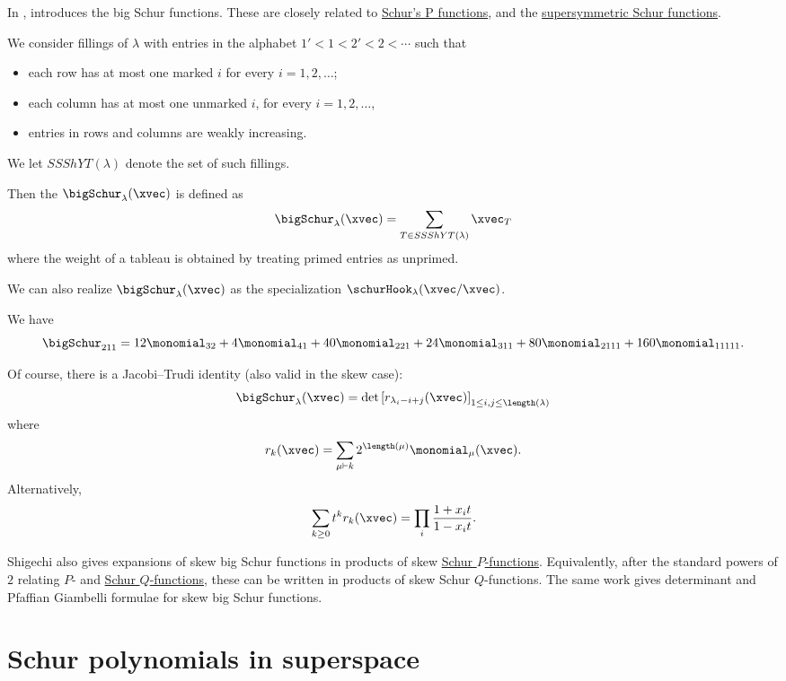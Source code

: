 In \cite{Shigechi2017x},  introduces the big Schur functions.
These are closely related to \hyperref[schurP]{Schur's P functions},
and the \hyperref[hookSchur]{supersymmetric Schur functions}.

We consider fillings of $\lambda$ with entries in
the alphabet $1' \lt 1 \lt 2' \lt 2 \lt \dotsb $
such that
\begin{itemize}
\item
	each row has at most one marked $i$ for every $i=1,2,\dotsc$;
\item
	each column has at most one unmarked $i$, for every $i=1,2,\dotsc$,
\item
	entries in rows and columns are weakly increasing.
\end{itemize}
We let $SSShYT(\lambda)$ denote the set of such fillings.

Then the \label{bigSchurFunction}
$\bigSchur_{\lambda}(\xvec)$
is defined as
\[
\bigSchur_{\lambda}(\xvec) = \sum_{T \in SSShYT(\lambda)} \xvec_T
\]
where the weight of a tableau is obtained by treating primed entries as unprimed.

We can also realize $\bigSchur_{\lambda}(\xvec)$ as the specialization $\schurHook_{\lambda}(\xvec/\xvec)$.


\begin{example}
We have
\[
\bigSchur_{211}
= 12 \monomial_{32}+4 \monomial_{41}+40 \monomial_{221}
+24 \monomial_{311}+80 \monomial_{2111}+160 \monomial_{11111}.
\]
\end{example}


Of course, there is a Jacobi--Trudi identity (also valid in the skew case):
\[
\bigSchur_{\lambda}(\xvec) = \det\left[ r_{\lambda_i -i +j}(\xvec) \right]_{1\leq i, j \leq \length(\lambda)}
\]
where
\[
r_k(\xvec) = \sum_{\mu \vdash k} 2^{\length(\mu)} \monomial_{\mu}(\xvec).
\]
Alternatively,
\[
\sum_{k \geq 0} t^k r_k(\xvec) =
\prod_{i} \frac{1+x_i t}{1-x_i t}.
\]

Shigechi also gives expansions of skew big Schur functions in products of
skew \hyperref[schurP]{Schur $P$-functions}.  Equivalently, after the
standard powers of $2$ relating $P$- and \hyperref[schurQ]{Schur
$Q$-functions}, these can be written in products of skew Schur
$Q$-functions.  The same work gives determinant and Pfaffian Giambelli
formulae for skew big Schur functions.



\section[schurSuperspace]{Schur polynomials in superspace}


